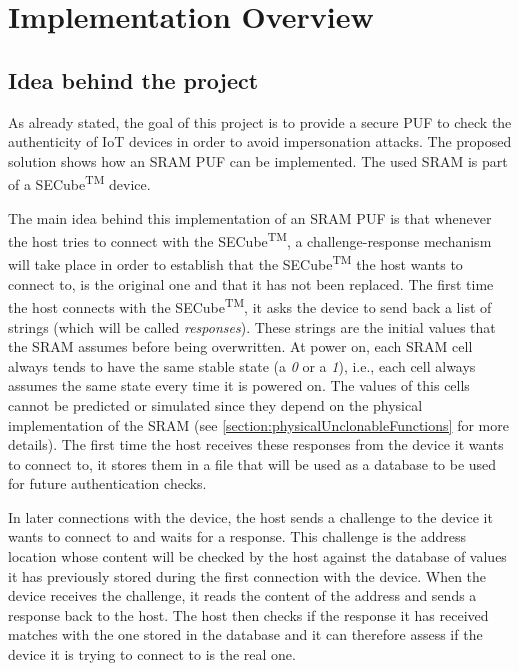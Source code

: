 \chapter{Implementation Overview}

\section {Idea behind the project} 
As already stated, the goal of this project is to provide a secure PUF to check the authenticity of IoT devices in order to avoid impersonation attacks. The proposed solution shows how an SRAM PUF can be implemented. The used SRAM is part of a SECube\textsuperscript{TM} device.

The main idea behind this implementation of an SRAM PUF is that whenever the host tries to connect with the SECube\textsuperscript{TM}, a challenge-response mechanism will take place in order to establish that the SECube\textsuperscript{TM} the host wants to connect to, is the original one and that it has not been replaced. 
The first time the host connects with the SECube\textsuperscript{TM}, it asks the device to send back a list of strings (which will be called \emph{responses}). These strings are the initial values that the SRAM assumes before being overwritten. At power on, each SRAM cell always tends to have the same stable state (a \emph{0} or a \emph{1}), i.e., each cell always assumes the same state every time it is powered on. The values of this cells cannot be predicted or simulated since they depend on the physical implementation of the SRAM (see \ref{section:physicalUnclonableFunctions} for more details). 
The first time the host receives these responses from the device it wants to connect to, it stores them in a file that will be used as a database to be used for future authentication checks.

In later connections with the device, the host sends a challenge to the device it wants to connect to and waits for a response. This challenge is the address location whose content will be checked by the host against the database of values it has previously stored during the first connection with the device. When the device receives the challenge, it reads the content of the address and sends a response back to the host. The host then checks if the response it has received matches with the one stored in the database and it can therefore assess if the device it is trying to connect to is the real one.


